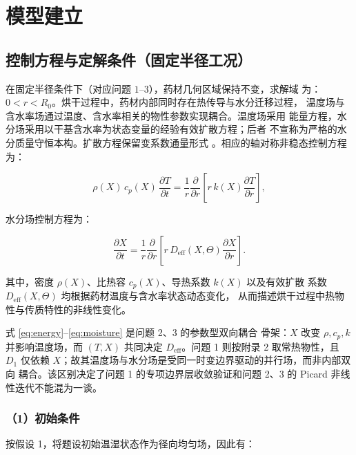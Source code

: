 \documentclass[withoutpreface,bwprint]{cumcmthesis}
\begin{document}
\addtocounter{table}{-1} %

\section{模型建立}

\subsection{控制方程与定解条件（固定半径工况）}

在固定半径条件下（对应问题 $1$--$3$），药材几何区域保持不变，求解域
为：$0<r<R_0$。烘干过程中，药材内部同时存在热传导与水分迁移过程，
温度场与含水率场通过温度、含水率相关的物性参数实现耦合。温度场采用
能量方程，水分场采用以干基含水率为状态变量的经验有效扩散方程；后者
不宣称为严格的水分质量守恒本构。扩散方程保留变系数通量形式
\cite{crank1975}。相应的轴对称非稳态控制方程为：

\begin{equation}
  \rho(X)\,c_p(X)\,\frac{\partial T}{\partial t}
  =\frac{1}{r}\frac{\partial}{\partial r}
  \left[r\,k(X)\frac{\partial T}{\partial r}\right],
  \label{eq:energy}
\end{equation}

水分场控制方程为：

\begin{equation}
  \frac{\partial X}{\partial t}
  =\frac{1}{r}\frac{\partial}{\partial r}
  \left[r\,D_{\mathrm{eff}}(X,\Theta)\frac{\partial X}{\partial r}\right].
  \label{eq:moisture}
\end{equation}

其中，密度 $\rho(X)$、比热容 $c_p(X)$、导热系数 $k(X)$ 以及有效扩散
系数 $D_{\mathrm{eff}}(X,\Theta)$ 均根据药材温度与含水率状态动态变化，
从而描述烘干过程中热物性与传质特性的非线性变化。

式 \eqref{eq:energy}--\eqref{eq:moisture} 是问题 2、3 的参数型双向耦合
骨架：$X$ 改变 $\rho,c_p,k$ 并影响温度场，而 $(T,X)$ 共同决定
$D_{\mathrm{eff}}$。问题 1 则按附录 2 取常热物性，且 $D_1$ 仅依赖
$X$；故其温度场与水分场是受同一时变边界驱动的并行场，而非内部双向
耦合。该区别决定了问题 1 的专项边界层收敛验证和问题 2、3 的 Picard
非线性迭代不能混为一谈。

\subsubsection*{（1）初始条件}

按假设 1，将题设初始温湿状态作为径向均匀场，因此有：
\end{document}
